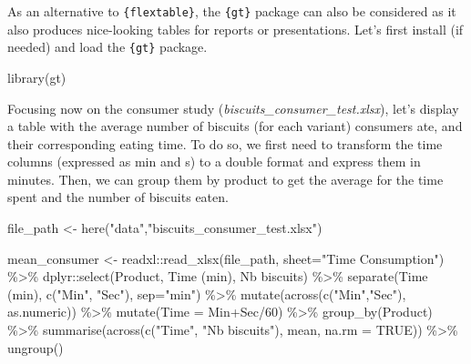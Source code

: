 \documentclass[
]{krantz}
\makeatletter
\newenvironment{Shaded}{\begin{snugshade}}{\end{snugshade}}
\newcommand{\AttributeTok}[1]{\textcolor[rgb]{0.61,0.61,0.61}{#1}}
\newcommand{\ConstantTok}[1]{\textcolor[rgb]{0,0,0}{#1}}
\newcommand{\DecValTok}[1]{\textcolor[rgb]{0.06,0.06,0.06}{#1}}
\newcommand{\FunctionTok}[1]{\textcolor[rgb]{0,0,0}{#1}}
\newcommand{\NormalTok}[1]{#1}
\newcommand{\OtherTok}[1]{\textcolor[rgb]{0.37,0.37,0.37}{#1}}
\newcommand{\SpecialCharTok}[1]{\textcolor[rgb]{0,0,0}{#1}}
\newcommand{\StringTok}[1]{\textcolor[rgb]{0.5,0.5,0.5}{#1}}
\newenvironment{kframe}{%
\medskip{}
\setlength{\fboxsep}{.8em}
 \def\at@end@of@kframe{}%
 \ifinner\ifhmode%
  \def\at@end@of@kframe{\end{minipage}}%
  \begin{minipage}{\columnwidth}%
 \fi\fi%
 \def\FrameCommand##1{\hskip\@totalleftmargin \hskip-\fboxsep
 \colorbox{shadecolor}{##1}\hskip-\fboxsep
     \hskip-\linewidth \hskip-\@totalleftmargin \hskip\columnwidth}%
 \MakeFramed {\advance\hsize-\width
   \@totalleftmargin\z@ \linewidth\hsize
   \@setminipage}}%
 {\par\unskip\endMakeFramed%
 \at@end@of@kframe}
\renewenvironment{Shaded}{\begin{kframe}}{\end{kframe}}
\makeatother
\begin{document}
As an alternative to \texttt{\{flextable\}}, the \texttt{\{gt\}} package can also be considered as it also produces nice-looking tables for reports or presentations.
Let's first install (if needed) and load the \texttt{\{gt\}} package.

\begin{Shaded}
\begin{Highlighting}[]
\FunctionTok{library}\NormalTok{(gt)}
\end{Highlighting}
\end{Shaded}

Focusing now on the consumer study (\emph{biscuits\_consumer\_test.xlsx}), let's display a table with the average number of biscuits (for each variant) consumers ate, and their corresponding eating time. To do so, we first need to transform the time columns (expressed as min and s) to a double format and express them in minutes. Then, we can group them by product to get the average for the time spent and the number of biscuits eaten.

\begin{Shaded}
\begin{Highlighting}[]
\NormalTok{file\_path }\OtherTok{\textless{}{-}} \FunctionTok{here}\NormalTok{(}\StringTok{"data"}\NormalTok{,}\StringTok{"biscuits\_consumer\_test.xlsx"}\NormalTok{) }

\NormalTok{mean\_consumer }\OtherTok{\textless{}{-}}\NormalTok{ readxl}\SpecialCharTok{::}\FunctionTok{read\_xlsx}\NormalTok{(file\_path, }
                                   \AttributeTok{sheet=}\StringTok{"Time Consumption"}\NormalTok{) }\SpecialCharTok{\%\textgreater{}\%}
\NormalTok{  dplyr}\SpecialCharTok{::}\FunctionTok{select}\NormalTok{(Product, }\StringTok{\textasciigrave{}}\AttributeTok{Time (min)}\StringTok{\textasciigrave{}}\NormalTok{, }\StringTok{\textasciigrave{}}\AttributeTok{Nb biscuits}\StringTok{\textasciigrave{}}\NormalTok{) }\SpecialCharTok{\%\textgreater{}\%}
  \FunctionTok{separate}\NormalTok{(}\StringTok{\textasciigrave{}}\AttributeTok{Time (min)}\StringTok{\textasciigrave{}}\NormalTok{, }\FunctionTok{c}\NormalTok{(}\StringTok{"Min"}\NormalTok{, }\StringTok{"Sec"}\NormalTok{), }\AttributeTok{sep=}\StringTok{"min"}\NormalTok{) }\SpecialCharTok{\%\textgreater{}\%}
  \FunctionTok{mutate}\NormalTok{(}\FunctionTok{across}\NormalTok{(}\FunctionTok{c}\NormalTok{(}\StringTok{"Min"}\NormalTok{,}\StringTok{"Sec"}\NormalTok{), as.numeric)) }\SpecialCharTok{\%\textgreater{}\%} 
  \FunctionTok{mutate}\NormalTok{(}\AttributeTok{Time =}\NormalTok{ Min}\SpecialCharTok{+}\NormalTok{Sec}\SpecialCharTok{/}\DecValTok{60}\NormalTok{) }\SpecialCharTok{\%\textgreater{}\%} 
  \FunctionTok{group\_by}\NormalTok{(Product) }\SpecialCharTok{\%\textgreater{}\%} 
  \FunctionTok{summarise}\NormalTok{(}\FunctionTok{across}\NormalTok{(}\FunctionTok{c}\NormalTok{(}\StringTok{"Time"}\NormalTok{, }\StringTok{"Nb biscuits"}\NormalTok{), mean, }\AttributeTok{na.rm =} \ConstantTok{TRUE}\NormalTok{)) }\SpecialCharTok{\%\textgreater{}\%} 
  \FunctionTok{ungroup}\NormalTok{()}
\end{Highlighting}
\end{Shaded}
\end{document}
